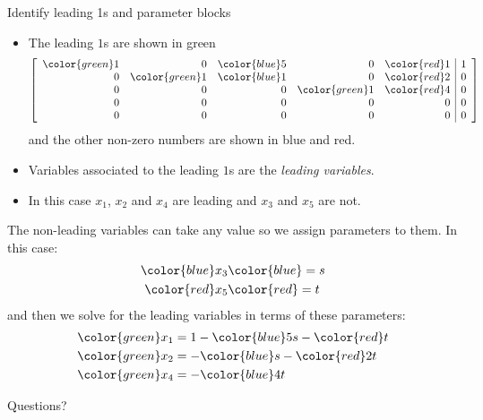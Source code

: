 \documentclass{beamer}
\begin{document}
\begin{frame}{Identify leading 1s and parameter blocks}
  \begin{itemize}
  \item The leading $1$s are shown in green
    \begin{equation*}
      \left[\begin{array}{rrrrr|r}
               {\color{green}1} & 0 & {\color{blue}5} & 0 & {\color{red}1} &1 \\
               0 & {\color{green}1} & {\color{blue}1} & 0 & {\color{red}2} &0 \\
               0 & 0 & 0 & {\color{green}1} & {\color{red}4} &0 \\
               0 & 0 & 0 & 0 & 0 &0\\
               0 & 0 & 0 & 0 & 0 &0
            \end{array}\right] 
        \end{equation*}
        and the other non-zero numbers are shown in blue and red.\vfill
      \item Variables associated to the leading $1$s are the \emph{leading variables}.\vfill
      \item In this case $x_1$, $x_2$ and $x_4$ are leading and $x_3$ and $x_5$ are not.
  \end{itemize}
\end{frame}

\begin{frame}
  The non-leading variables can take any value so we assign parameters to them.\vfill
  In this case:
  \begin{align*}
    {\color{blue}x_3} &{\color{blue}= s}\\
    {\color{red}x_5} &{\color{red}= t}
  \end{align*}
  and then we solve for the leading variables in terms of these parameters:
  \begin{align*}
    {\color{green}x_1} &= 1-{\color{blue}5s}-{\color{red}t}\\
    {\color{green}x_2} &= -{\color{blue}s}-{\color{red}2t}\\
    {\color{green}x_4} &= -{\color{blue}4t}
  \end{align*}
\end{frame}

\begin{frame}
  Questions?
\end{frame}
\end{document}
